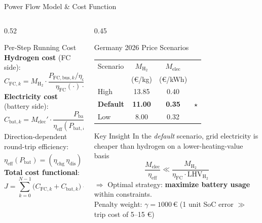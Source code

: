 \documentclass[aspectratio=169, 10pt]{beamer}
\newcommand{\SoC}{\mathrm{SoC}}
\newcommand{\etaFC}{\eta_{\mathrm{FC}}}
\newcommand{\MH}{M_{\mathrm{H_2}}}
\newcommand{\Mel}{M_{\mathrm{elec}}}
\newcommand{\LHV}{\mathrm{LHV}_{\mathrm{H_2}}}
\newcommand{\highlight}[1]{\textcolor{fcgold!80!black}{\textbf{#1}}}
\begin{document}
\begin{frame}{Power Flow Model \& Cost Function}
  \begin{columns}[T]
    \begin{column}{0.52\textwidth}
      \begin{block}{Per-Step Running Cost}
        \textbf{Hydrogen cost} (FC side):
        \[
          C_{\mathrm{FC},k} = \MH \cdot
            \frac{P_{\mathrm{FC,bus},k}/\eta_{dc} + P_{\mathrm{aux},k}}
                 {\etaFC(\cdot)\cdot\LHV}\,\Delta t
        \]
        \textbf{Electricity cost} (battery side):
        \[
          C_{\mathrm{bat},k} = \Mel' \cdot
            \frac{P_{\mathrm{bat},k}}{\eta_{\mathrm{eff}}(P_{\mathrm{bat},k},\SoC_k)}\,\Delta t
        \]
        Direction-dependent round-trip efficiency:
        \[
          \eta_{\mathrm{eff}}(P_{\mathrm{bat}}) =
            (\eta_{\mathrm{chg}}\,\eta_{\mathrm{dis}})^{\operatorname{sgn}(P_{\mathrm{bat}})}
        \]
        \textbf{Total cost functional}:
        \[
          \boxed{J = \sum_{k=0}^{N-1}\!\bigl(C_{\mathrm{FC},k}+C_{\mathrm{bat},k}\bigr)
                    + \underbrace{\gamma(\SoC_N - \SoC_{\mathrm{target}})^2}_{\text{terminal penalty}}}
        \]
      \end{block}
    \end{column}
    \begin{column}{0.45\textwidth}
      \begin{block}{Germany 2026 Price Scenarios}
        \renewcommand{\arraystretch}{1.3}
        \begin{tabular}{@{}lccc@{}}
          \toprule
          Scenario & $\MH$ & $\Mel$ & \\
          & (€/kg) & (€/kWh) & \\
          \midrule
          High   & 13.85 & 0.40 & \\
          \highlight{Default} & \highlight{11.00} & \highlight{0.35} & \highlight{$\star$} \\
          Low    & 8.00  & 0.32 & \\
          \bottomrule
        \end{tabular}
      \end{block}
      \vspace{6pt}
      \begin{alertblock}{Key Insight}
        In the \textit{default} scenario, grid electricity is cheaper than hydrogen
        on a lower-heating-value basis
        \[
          \frac{\Mel}{\eta_{\mathrm{eff}}} \ll \frac{\MH}{\etaFC\cdot\LHV}
        \]
        $\Rightarrow$ Optimal strategy: \highlight{maximize battery usage} within constraints.\\[4pt]
        Penalty weight: $\gamma = 1000\,\text{€}$ (1 unit SoC error $\gg$ trip cost of 5–15 €)
      \end{alertblock}
    \end{column}
  \end{columns}
\end{frame}
\end{document}
